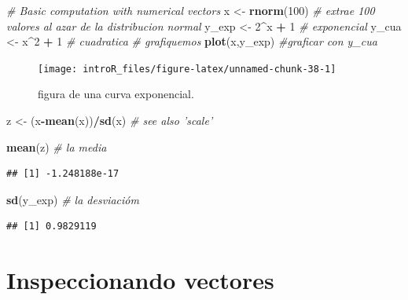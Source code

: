 \documentclass[
]{book}
\newenvironment{Shaded}{\begin{snugshade}}{\end{snugshade}}
\newcommand{\CommentTok}[1]{\textcolor[rgb]{0.56,0.35,0.01}{\textit{#1}}}
\newcommand{\DecValTok}[1]{\textcolor[rgb]{0.00,0.00,0.81}{#1}}
\newcommand{\KeywordTok}[1]{\textcolor[rgb]{0.13,0.29,0.53}{\textbf{#1}}}
\newcommand{\NormalTok}[1]{#1}
\newcommand{\OperatorTok}[1]{\textcolor[rgb]{0.81,0.36,0.00}{\textbf{#1}}}
\newcommand{\StringTok}[1]{\textcolor[rgb]{0.31,0.60,0.02}{#1}}
\begin{document}
\begin{Shaded}
\begin{Highlighting}[]
\CommentTok{# Basic computation with numerical vectors}
\NormalTok{x <-}\StringTok{ }\KeywordTok{rnorm}\NormalTok{(}\DecValTok{100}\NormalTok{) }\CommentTok{# extrae 100 valores al azar de la distribucion normal}
\NormalTok{y_exp <-}\StringTok{ }\DecValTok{2}\OperatorTok{^}\NormalTok{x }\OperatorTok{+}\StringTok{ }\DecValTok{1} \CommentTok{# exponencial}
\NormalTok{y_cua <-}\StringTok{ }\NormalTok{x}\OperatorTok{^}\DecValTok{2} \OperatorTok{+}\StringTok{ }\DecValTok{1} \CommentTok{# cuadratica}
\CommentTok{# grafiquemos}
\KeywordTok{plot}\NormalTok{(x,y_exp) }\CommentTok{#graficar con y_cua}
\end{Highlighting}
\end{Shaded}

\begin{figure}

{\centering \texttt{[image: introR\_files/figure-latex/unnamed-chunk-38-1]} 

}

\caption{figura de una curva exponencial.}\label{fig:unnamed-chunk-38}
\end{figure}

\begin{Shaded}
\begin{Highlighting}[]
\NormalTok{z <-}\StringTok{ }\NormalTok{(x}\OperatorTok{-}\KeywordTok{mean}\NormalTok{(x))}\OperatorTok{/}\KeywordTok{sd}\NormalTok{(x)  }\CommentTok{# see also 'scale'}

\KeywordTok{mean}\NormalTok{(z) }\CommentTok{# la media}
\end{Highlighting}
\end{Shaded}

\begin{verbatim}
## [1] -1.248188e-17
\end{verbatim}

\begin{Shaded}
\begin{Highlighting}[]
\KeywordTok{sd}\NormalTok{(y_exp) }\CommentTok{# la desviacióm}
\end{Highlighting}
\end{Shaded}

\begin{verbatim}
## [1] 0.9829119
\end{verbatim}

\hypertarget{inspeccionando-vectores}{%
\section{Inspeccionando vectores}\label{inspeccionando-vectores}}
\end{document}

